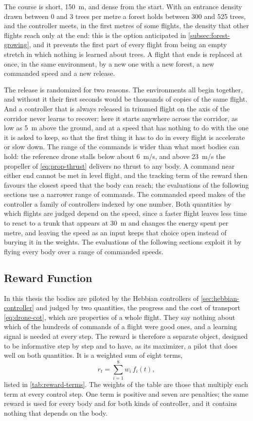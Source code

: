 The course is short, 150~m, and dense from the start. With an entrance density drawn between 0 and 3 trees per metre a forest holds between 300 and 525 trees, and the controller meets, in the first metres of some flights, the density that other flights reach only at the end: this is the option anticipated in \autoref{subsec:forest-growing}, and it prevents the first part of every flight from being an empty stretch in which nothing is learned about trees. A flight that ends is replaced at once, in the same environment, by a new one with a new forest, a new commanded speed and a new release.

The release is randomized for two reasons. The environments all begin together, and without it their first seconds would be thousands of copies of the same flight. And a controller that is always released in trimmed flight on the axis of the corridor never learns to recover: here it starts anywhere across the corridor, as low as 5~m above the ground, and at a speed that has nothing to do with the one it is asked to keep, so that the first thing it has to do in every flight is accelerate or slow down. The range of the commands is wider than what most bodies can hold: the reference drone stalls below about 6~m/s, and above 23~m/s the propeller of \eqref{eq:prop-thrust} delivers no thrust to any body. A command near either end cannot be met in level flight, and the tracking term of the reward then favours the closest speed that the body can reach; the evaluations of the following sections use a narrower range of commands. The commanded speed makes of the controller a family of controllers indexed by one number. Both quantities by which flights are judged depend on the speed, since a faster flight leaves less time to react to a trunk that appears at 30~m and changes the energy spent per metre, and leaving the speed as an input keeps that choice open instead of burying it in the weights. The evaluations of the following sections exploit it by flying every body over a range of commanded speeds.

\subsection{Reward Function}
\label{subsec:reward}

In this thesis the bodies are piloted by the Hebbian controllers of \autoref{sec:hebbian-controller} and judged by two quantities, the progress and the cost of transport \eqref{eq:drone-cot}, which are properties of a whole flight. They say nothing about which of the hundreds of commands of a flight were good ones, and a learning signal is needed at every step. The reward is therefore a separate object, designed to be informative step by step and to have, as its maximizer, a pilot that does well on both quantities. It is a weighted sum of eight terms,
\begin{equation}
r_t = \sum_{i=1}^{8} w_i\, f_i(t),
\label{eq:reward}
\end{equation}
listed in \autoref{tab:reward-terms}. The weights of the table are those that multiply each term at every control step. One term is positive and seven are penalties; the same reward is used for every body and for both kinds of controller, and it contains nothing that depends on the body.

